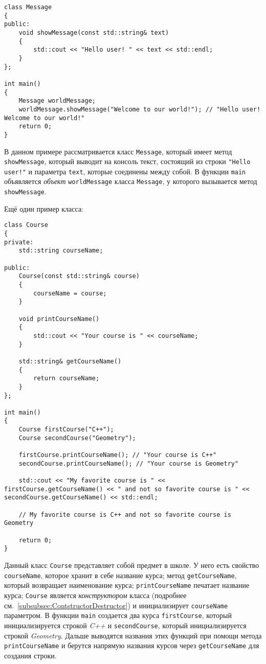 \begin{lstlisting}
class Message
{
public:
    void showMessage(const std::string& text)
    {
        std::cout << "Hello user! " << text << std::endl;
    }
};

int main()
{
    Message worldMessage;
    worldMessage.showMessage("Welcome to our world!"); // "Hello user! Welcome to our world!"
    return 0;
}
\end{lstlisting}

В данном примере рассматривается класс \lstinline|Message|, который имеет метод \lstinline|showMessage|, который выводит на консоль текст, состоящий из строки \lstinline|"Hello user!"| и параметра \lstinline|text|, которые соединены между собой. В функции \lstinline|main| объявляется \emph{объект} \lstinline|worldMessage| класса \lstinline|Message|, у которого вызывается метод \lstinline|showMessage|.

Ещё один пример класса:
\begin{lstlisting}
class Course
{
private:
    std::string courseName;

public:
    Course(const std::string& course)
    {
        courseName = course;
    }

    void printCourseName()
    {
        std::cout << "Your course is " << courseName;
    }

    std::string& getCourseName()
    {
        return courseName;
    }
};

int main()
{
    Course firstCourse("C++");
    Course secondCourse("Geometry");

    firstCourse.printCourseName(); // "Your course is C++"
    secondCourse.printCourseName(); // "Your course is Geometry"

    std::cout << "My favorite course is " << firstCourse.getCourseName() << " and not so favorite course is " << secondCourse.getCourseName() << std::endl;

    // My favorite course is C++ and not so favorite course is Geometry

    return 0;
}
\end{lstlisting}

Данный класс \lstinline|Course| представляет собой предмет в школе. У него есть свойство \lstinline|courseName|, которое хранит в себе название курса; метод \lstinline|getCourseName|, который возвращает наименование курса; \lstinline|printCourseName| печатает название курса; \lstinline|Course| является \emph{конструктором} класса (подробнее см.~\ref{subsubsec:ContstructorDestructor}) и инициализирует \lstinline|courseName| параметром. В функции \lstinline|main| создается два курса \lstinline|firstCourse|, который инициализируется строкой \emph{C++} и \lstinline|secondCourse|, который инициализируется строкой \emph{Geometry}. Дальше выводятся названия этих функций при помощи метода \lstinline|printCourseName| и берутся напрямую названия курсов через \lstinline|getCourseName| для создания строки.

